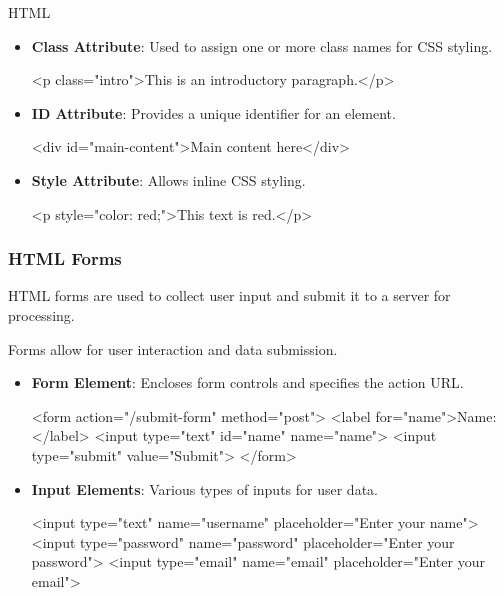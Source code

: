\begin{notes}{HTML}
\begin{highlight}
        \begin{itemize}
            \item \textbf{Class Attribute}: Used to assign one or more class names for CSS styling.
    \begin{code}[HTML]
    <p class="intro">This is an introductory paragraph.</p>
    \end{code}
            \item \textbf{ID Attribute}: Provides a unique identifier for an element.
    \begin{code}[HTML]
    <div id="main-content">Main content here</div>
    \end{code}
            \item \textbf{Style Attribute}: Allows inline CSS styling.
    \begin{code}[HTML]
    <p style="color: red;">This text is red.</p>
    \end{code}
        \end{itemize}
    
    \end{highlight}
    
    \subsubsection*{HTML Forms}
    
    HTML forms are used to collect user input and submit it to a server for processing.
    
    \begin{highlight}
    
        Forms allow for user interaction and data submission.
        
        \begin{itemize}
            \item \textbf{Form Element}: Encloses form controls and specifies the action URL.
    \begin{code}[HTML]
    <form action="/submit-form" method="post">
        <label for="name">Name:</label>
        <input type="text" id="name" name="name">
        <input type="submit" value="Submit">
    </form>
    \end{code}
            \item \textbf{Input Elements}: Various types of inputs for user data.
    \begin{code}[HTML]
    <input type="text" name="username" placeholder="Enter your name">
    <input type="password" name="password" placeholder="Enter your password">
    <input type="email" name="email" placeholder="Enter your email">
    \end{code}
        \end{itemize}
    

\end{highlight}
\end{notes}
